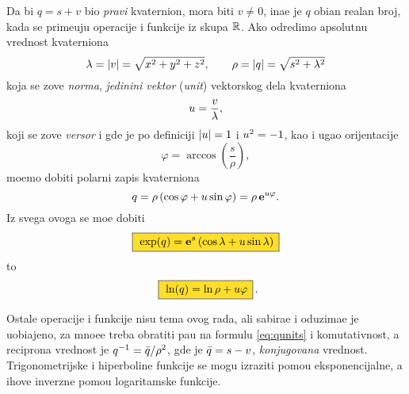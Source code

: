 Da bi $q=s+v$ bio {\sl pravi\/} kvaternion, mora biti $v\ne0$, ina{\cv}e je $q$ obi{\cv}an realan broj, 
kada se prime{\nj}uju operacije i funkcije iz skupa ${\mathbb R}$.
Ako odredimo apsolutnu vrednost kvaterniona
$$
\lambda = {\vert v\vert} = \sqrt{\mathstrut x^2+y^2+z^2},\qquad
\rho = {\vert q\vert} = \sqrt{\mathstrut s^2+\lambda^2}
$$
koja se zove {\sl norma\/},
{\sl jedini{\cv}ni vektor\/} ({\sl unit\/}) vektorskog dela kvaterniona
$$
{u} = \frac v\lambda, 
$$
koji se zove {\sl versor}
i gde je po definiciji
${\vert{u}\vert}=1$ i  ${u}^2=-1$,
kao i ugao orijentacije
$$
\varphi = \arccos\left( \frac s\rho \right),
$$
mo{\zv}emo dobiti polarni zapis kvaterniona
\begin{equation}
    q
=\rho\,(\cos\varphi + {u}\sin\varphi)
=\rho\,{\bf e}^{{u}\varphi}.
\end{equation}
Iz svega ovoga se mo{\zv}e dobiti
\begin{equation}
    \okvir{\exp(q) = \e^s \left( \cos\lambda + \uv\sin\lambda \right)}
\end{equation}
\hbox to \textwidth{\hss i\hss}
\begin{equation}
    \okvir{\ln(q)  = \ln\rho + \uv\varphi}\rlap{.}
\end{equation}

\medskip

\danger
Ostale operacije i funkcije nisu tema ovog rada, ali sabira{\nj}e i oduzima{\nj}e
je uobi\-{\cv}a\-jeno, za mno{\zv}e{\nj}e treba obratiti pa{\zv}{\nj}u na formulu \eqref{eq:qunits} i
komutativnost, a recipro{\cv}na vrednost je
$q^{-1}={\bar q}/\rho^2$, gde je ${\bar q}=s-v$, {\sl konjugovana\/} vrednost. 
Tri\-gono\-metrijske i hiperboli{\cv}ne funkcije se mogu izraziti pomo{\cc}u eksponencijalne,
a {\nj}ihove inverzne pomo{\cc}u logaritamske funkcije.\par

